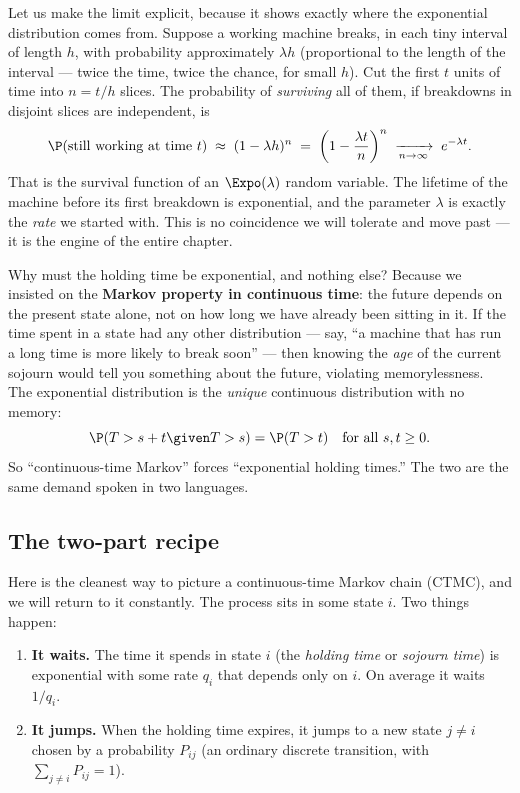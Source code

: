 Let us make the limit explicit, because it shows exactly where the exponential distribution comes
from. Suppose a working machine breaks, in each tiny interval of length $h$, with probability
approximately $\lambda h$ (proportional to the length of the interval --- twice the time, twice the
chance, for small $h$). Cut the first $t$ units of time into $n = t/h$ slices. The probability of
\emph{surviving} all of them, if breakdowns in disjoint slices are independent, is
\[
  \P(\text{still working at time } t)
  \;\approx\; (1 - \lambda h)^{n}
  \;=\; \left(1 - \frac{\lambda t}{n}\right)^{n}
  \;\xrightarrow[n \to \infty]{}\; e^{-\lambda t}.
\]
That is the survival function of an $\Expo(\lambda)$ random variable. The lifetime of the machine
before its first breakdown is exponential, and the parameter $\lambda$ is exactly the \emph{rate} we
started with. This is no coincidence we will tolerate and move past --- it is the engine of the
entire chapter.

\begin{whybox}
Why must the holding time be exponential, and nothing else? Because we insisted on the
\textbf{Markov property in continuous time}: the future depends on the present state alone, not on
how long we have already been sitting in it. If the time spent in a state had any other distribution
--- say, ``a machine that has run a long time is more likely to break soon'' --- then knowing the
\emph{age} of the current sojourn would tell you something about the future, violating
memorylessness. The exponential distribution is the \emph{unique} continuous distribution with no
memory:
\[
  \P(T > s + t \given T > s) = \P(T > t)
  \quad\text{for all } s, t \ge 0.
\]
So ``continuous-time Markov'' forces ``exponential holding times.'' The two are the same demand
spoken in two languages.
\end{whybox}

\subsection{The two-part recipe}

Here is the cleanest way to picture a continuous-time Markov chain (CTMC), and we will return to it
constantly. The process sits in some state $i$. Two things happen:

\begin{enumerate}
  \item \textbf{It waits.} The time it spends in state $i$ (the \emph{holding time} or
  \emph{sojourn time}) is exponential with some rate $q_i$ that depends only on $i$. On average it
  waits $1/q_i$.
  \item \textbf{It jumps.} When the holding time expires, it jumps to a new state $j \ne i$ chosen
  by a probability $P_{ij}$ (an ordinary discrete transition, with $\sum_{j \ne i} P_{ij} = 1$).
\end{enumerate}

